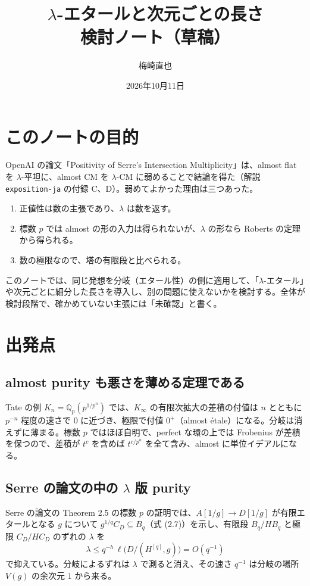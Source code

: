 \documentclass[11pt,a4paper]{ltjsarticle}
\title{$\lambda$-エタールと次元ごとの長さ\\[2pt]\large 検討ノート（草稿）}
\author{梅崎直也}
\date{2026年10月11日}
\theoremstyle{plain}
\theoremstyle{definition}
\theoremstyle{remark}
\theoremstyle{plain}
\begin{document}
\maketitle

\section*{このノートの目的}

OpenAI の論文「Positivity of Serre's Intersection Multiplicity」は、almost flat を $\lambda$-平坦に、almost CM を $\lambda$-CM に弱めることで結論を得た（解説 \texttt{exposition-ja} の付録 C、D）。弱めてよかった理由は三つあった。
\begin{enumerate}
  \item 正値性は数の主張であり、$\lambda$ は数を返す。
  \item 標数 $p$ では almost の形の入力は得られないが、$\lambda$ の形なら Roberts の定理から得られる。
  \item 数の極限なので、塔の有限段と比べられる。
\end{enumerate}
このノートでは、同じ発想を分岐（エタール性）の側に適用して、「$\lambda$-エタール」や次元ごとに細分した長さを導入し、別の問題に使えないかを検討する。全体が検討段階で、確かめていない主張には「未確認」と書く。

\section{出発点}

\subsection{almost purity も悪さを薄める定理である}
Tate の例 $K_n = \mathbb{Q}_p(p^{1/p^n})$ では、$K_\infty$ の有限次拡大の差積の付値は $n$ とともに $p^{-n}$ 程度の速さで $0$ に近づき、極限で付値 $0^+$（almost étale）になる。分岐は消えずに薄まる。標数 $p$ ではほぼ自明で、perfect な環の上では Frobenius が差積を保つので、差積が $t^c$ を含めば $t^{c/p^n}$ を全て含み、almost に単位イデアルになる。

\subsection{Serre の論文の中の $\lambda$ 版 purity}
Serre の論文の Theorem 2.5 の標数 $p$ の証明では、$A[1/g]\to D[1/g]$ が有限エタールとなる $g$ について $g^{1/q}C_D\subseteq B_q$（式 (2.7)）を示し、有限段 $B_q/HB_q$ と極限 $C_D/HC_D$ のずれの $\lambda$ を
\[
  \lambda\le q^{-h}\,\ell\bigl(D/(H^{[q]},g)\bigr) = O(q^{-1})
\]
で抑えている。分岐によるずれは $\lambda$ で測ると消え、その速さ $q^{-1}$ は分岐の場所 $V(g)$ の余次元 $1$ から来る。
\end{document}
